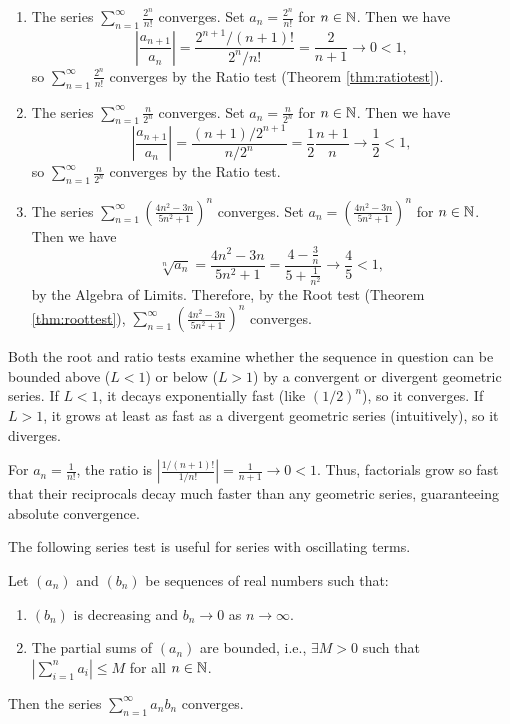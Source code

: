 \documentclass[../analysis1.tex]{subfiles}
\begin{document}
\begin{example}
    \begin{enumerate}
        \item[1.] The series $\sum_{n=1}^{\infty}\frac{2^n}{n!}$ converges. Set $a_n=\frac{2^n}{n!}$ for $n\in\mathbb{N}$. Then we have \[\left|\frac{a_{n+1}}{a_n}\right|=\frac{2^{n+1}/(n+1)!}{2^n/n!}=\frac{2}{n+1}\to 0<1,\] so $\sum_{n=1}^{\infty}\frac{2^n}{n!}$ converges by the Ratio test (Theorem \ref{thm:ratiotest}).
        \item[2.] The series $\sum_{n=1}^{\infty}\frac{n}{2^n}$ converges. Set $a_n=\frac{n}{2^n}$ for $n\in\mathbb{N}$. Then we have \[\left|\frac{a_{n+1}}{a_n}\right|=\frac{(n+1)/2^{n+1}}{n/2^n}=\frac{1}{2}\frac{n+1}{n}\to \frac{1}{2}<1,\] so $\sum_{n=1}^{\infty}\frac{n}{2^n}$ converges by the Ratio test.
        \item[3.] The series $\sum_{n=1}^{\infty}\left(\frac{4n^2-3n}{5n^2+1}\right)^n$ converges. Set $a_n=\left(\frac{4n^2-3n}{5n^2+1}\right)^n$ for $n\in\mathbb{N}$. Then we have \[\sqrt[n]{a_n}=\frac{4n^2-3n}{5n^2+1}=\frac{4-\frac{3}{n}}{5+\frac{1}{n^2}}\to \frac{4}{5}<1,\] by the Algebra of Limits. Therefore, by the Root test (Theorem \ref{thm:roottest}), $\sum_{n=1}^{\infty}\left(\frac{4n^2-3n}{5n^2+1}\right)^n$ converges.
    \end{enumerate}
\end{example}


\begin{remark}
    Both the root and ratio tests examine whether the sequence in question can be bounded above ($L<1$) or below ($L>1$) by a convergent or divergent geometric series. If $L < 1$, it decays exponentially fast (like $(1/2)^n$), so it converges. If $L > 1$, it grows at least as fast as a divergent geometric series (intuitively), so it diverges.
\end{remark}
\begin{example}
    For $a_n = \frac{1}{n!}$, the ratio is $\left| \frac{1/(n+1)!}{1/n!} \right| = \frac{1}{n+1} \to 0 < 1$. Thus, factorials grow so fast that their reciprocals decay much faster than any geometric series, guaranteeing absolute convergence.
\end{example}
The following series test is useful for series with oscillating terms.
\begin{theorem}
\label{thm:dirichlettest}
    \begin{shaded*}
        Let $(a_n)$ and $(b_n)$ be sequences of real numbers such that:
        \begin{enumerate}
            \item[1.] $(b_n)$ is decreasing and $b_n \to 0$ as $n \to \infty$.
            \item[2.] The partial sums of $(a_n)$ are bounded, i.e., $\exists M > 0$ such that $\left| \sum_{i=1}^n a_i \right| \le M$ for all $n \in \mathbb{N}$.
        \end{enumerate}
        Then the series $\sum_{n=1}^\infty a_n b_n$ converges.
    \end{shaded*}
\end{theorem}
\end{document}
